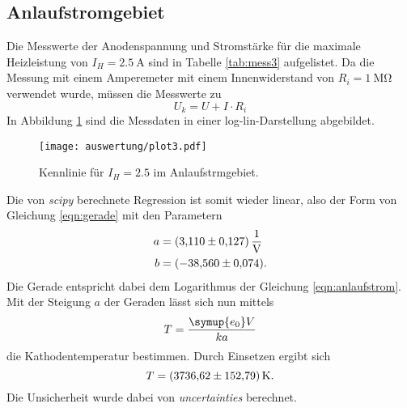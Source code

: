 \subsection{Anlaufstromgebiet}
\label{sec:anlauf}
Die Messwerte der Anodenspannung und Stromstärke für die maximale Heizleistung von $I_H=\SI{2.5}{\ampere}$ sind in Tabelle \ref{tab:mess3}
aufgelistet. Da die Messung mit einem Amperemeter mit einem Innenwiderstand von $R_i=\SI{1}{\mega\ohm}$ verwendet wurde, müssen die Messwerte
zu
\begin{equation*}
    U_k=U+I\cdot R_i
\end{equation*}
In Abbildung \ref{fig:plot3} sind die Messdaten in einer log-lin-Darstellung abgebildet.
\begin{figure}[H]
    \centering
    \texttt{[image: auswertung/plot3.pdf]}
    \caption{Kennlinie für $I_H=2.5$ im Anlaufstrmgebiet.}
    \label{fig:plot3}
\end{figure}
\noindent
Die von \textit{scipy} \cite{scipy} berechnete Regression ist somit wieder linear, also der Form von Gleichung \eqref{eqn:gerade} mit den Parametern
\begin{align*}
    a &= \SI{  3.11 \pm 0.127}{\per\volt}\\
    b &= \SI{-38.56 \pm 0.074}{}    .       %
\end{align*}
Die Gerade entspricht dabei dem Logarithmus der Gleichung \eqref{eqn:anlaufstrom}.
Mit der Steigung $a$ der Geraden lässt sich nun mittels
\begin{equation*}
    T=\frac{\symup{e_0}V}{ka}
\end{equation*}
die Kathodentemperatur bestimmen. Durch Einsetzen ergibt sich
\begin{equation*}
    T=\SI{3736.62 \pm 152.79}{\kelvin}  .
\end{equation*}
Die Unsicherheit wurde dabei von \textit{uncertainties} \cite{uncertainties} berechnet.

